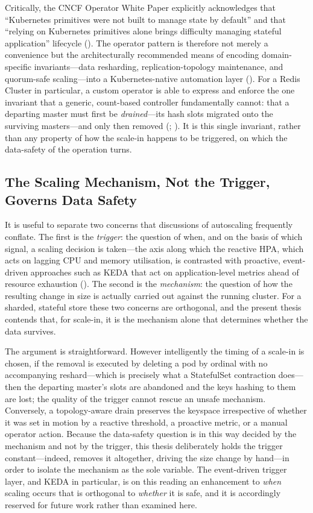 Critically, the CNCF Operator White Paper explicitly acknowledges that \enquote{Kubernetes
primitives were not built to manage state by default} and that \enquote{relying on
Kubernetes primitives alone brings difficulty managing stateful application} lifecycle
(\cite{cncf:operatorwhitepaper}). The operator pattern is therefore not merely a convenience
but the architecturally recommended means of encoding domain-specific invariants---data
resharding, replication-topology maintenance, and quorum-safe scaling---into a
Kubernetes-native automation layer (\cite{k8s:operator}). For a Redis Cluster in particular,
a custom operator is able to express and enforce the one invariant that a generic,
count-based controller fundamentally cannot: that a departing master must first be
\textit{drained}---its hash slots migrated onto the surviving masters---and only then
removed (\cite{opstree:redisoperator}; \cite{redis:scaling}). It is this single invariant,
rather than any property of how the scale-in happens to be triggered, on which the
data-safety of the operation turns.

\subsection{The Scaling Mechanism, Not the Trigger, Governs Data Safety}

It is useful to separate two concerns that discussions of autoscaling frequently conflate.
The first is the \textit{trigger}: the question of when, and on the basis of which signal, a
scaling decision is taken---the axis along which the reactive HPA, which acts on lagging CPU
and memory utilisation, is contrasted with proactive, event-driven approaches such as KEDA
that act on application-level metrics ahead of resource exhaustion
(\cite{keda:scalingdeployments}). The second is the \textit{mechanism}: the question of how
the resulting change in size is actually carried out against the running cluster. For a
sharded, stateful store these two concerns are orthogonal, and the present thesis contends
that, for scale-in, it is the mechanism alone that determines whether the data survives.

The argument is straightforward. However intelligently the timing of a scale-in is chosen,
if the removal is executed by deleting a pod by ordinal with no accompanying
reshard---which is precisely what a StatefulSet contraction does---then the departing
master's slots are abandoned and the keys hashing to them are lost; the quality of the
trigger cannot rescue an unsafe mechanism. Conversely, a topology-aware drain preserves the
keyspace irrespective of whether it was set in motion by a reactive threshold, a proactive
metric, or a manual operator action. Because the data-safety question is in this way decided
by the mechanism and not by the trigger, this thesis deliberately holds the trigger
constant---indeed, removes it altogether, driving the size change by hand---in order to
isolate the mechanism as the sole variable. The event-driven trigger layer, and KEDA in
particular, is on this reading an enhancement to \textit{when} scaling occurs that is
orthogonal to \textit{whether} it is safe, and it is accordingly reserved for future work
rather than examined here.

